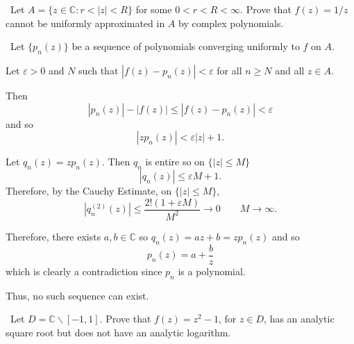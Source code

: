 \documentclass[12pt]{Qual}
\begin{document}
\begin{problem} $\,$
Let $A=\{z\in\mathbb{C}:r<|z|<R\}$ for some $0<r<R<\infty.$ Prove that $f(z)=1/z$ cannot be uniformly approximated in $A$ by complex polynomials.
\end{problem}


\begin{solution}$\,$
Let $\{p_n(z)\}$ be a sequence of polynomials converging uniformly to $f$ on $A$.

Let $\varepsilon>0$ and $N$ such that $|f(z)-p_n(z)|<\varepsilon$ for all $n\ge N$ and all $z\in A$.

Then $$|p_n(z)|-|f(z)|\le|f(z)-p_n(z)|<\varepsilon$$ and so $$|zp_n(z)|<\varepsilon|z|+1.$$

Let $q_n(z)=zp_n(z)$. Then $q_n$ is entire so on $\{|z|\le M\}$ $$|q_n(z)|\le \varepsilon M+1.$$ Therefore, by the Cauchy Estimate, on $\{|z|\le M\}$, $$|q_n^{(2)}(z)|\le\frac{2!(1+\varepsilon M)}{M^2}\to0\qquad M\to\infty.$$

Therefore, there exists $a,b\in\mathbb{C}$ so $q_n(z)=az+b=zp_n(z)$ and so $$p_n(z)=a+\frac{b}{z}$$ which is clearly a contradiction since $p_n$ is a polynomial.

Thus, no such sequence can exist.
\end{solution}
\newpage



\begin{problem} $\,$
Let $D=\mathbb{C}\backslash[-1,1]$. Prove that $f(z)=z^2-1$, for $z\in D$, has an analytic square root but does not have an analytic logarithm.
\end{problem}
\end{document}
